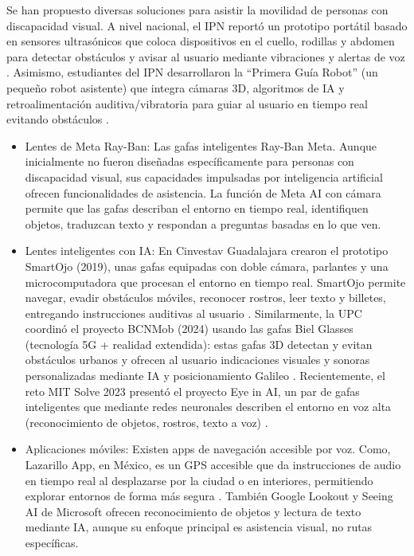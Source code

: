 Se han propuesto diversas soluciones para asistir la movilidad de personas con discapacidad visual. A nivel nacional, el IPN reportó un prototipo portátil basado en sensores ultrasónicos que coloca dispositivos en el cuello, rodillas y abdomen para detectar obstáculos y avisar al usuario mediante vibraciones y alertas de voz \cite{IPN_invidentes}. Asimismo, estudiantes del IPN desarrollaron la “Primera Guía Robot” (un pequeño robot asistente) que integra cámaras 3D, algoritmos de IA y retroalimentación auditiva/vibratoria para guiar al usuario en tiempo real evitando obstáculos \cite{AhorraSeguros2025_guia}. 

\begin{itemize}
    \item Lentes de Meta Ray-Ban: Las gafas inteligentes Ray-Ban Meta. Aunque inicialmente no fueron diseñadas específicamente para personas con discapacidad visual, sus capacidades impulsadas por inteligencia artificial ofrecen funcionalidades de asistencia. La función de Meta AI con cámara permite que las gafas describan el entorno en tiempo real, identifiquen objetos, traduzcan texto y respondan a preguntas basadas en lo que ven. \cite{meta_rayban_2024}

    \item Lentes inteligentes con IA: En Cinvestav Guadalajara crearon el prototipo SmartOjo (2019), unas gafas equipadas con doble cámara, parlantes y una microcomputadora que procesan el entorno en tiempo real. SmartOjo permite navegar, evadir obstáculos móviles, reconocer rostros, leer texto y billetes, entregando instrucciones auditivas al usuario \cite{cinestavlentes}. Similarmente, la UPC coordinó el proyecto BCNMob (2024) usando las gafas Biel Glasses (tecnología 5G + realidad extendida): estas gafas 3D detectan y evitan obstáculos urbanos y ofrecen al usuario indicaciones visuales y sonoras personalizadas mediante IA y posicionamiento Galileo \cite{CIT2024_gafas}. Recientemente, el reto MIT Solve 2023 presentó el proyecto Eye in AI, un par de gafas inteligentes que mediante redes neuronales describen el entorno en voz alta (reconocimiento de objetos, rostros, texto a voz) \cite{eyeAI2023}.

    \item Aplicaciones móviles: Existen apps de navegación accesible por voz. Como, Lazarillo App, en México, es un GPS accesible que da instrucciones de audio en tiempo real al desplazarse por la ciudad o en interiores, permitiendo explorar entornos de forma más segura \cite{Lazarillo2023_app}. También Google Lookout y Seeing AI de Microsoft ofrecen reconocimiento de objetos y lectura de texto mediante IA, aunque su enfoque principal es asistencia visual, no rutas específicas.


\end{itemize}
